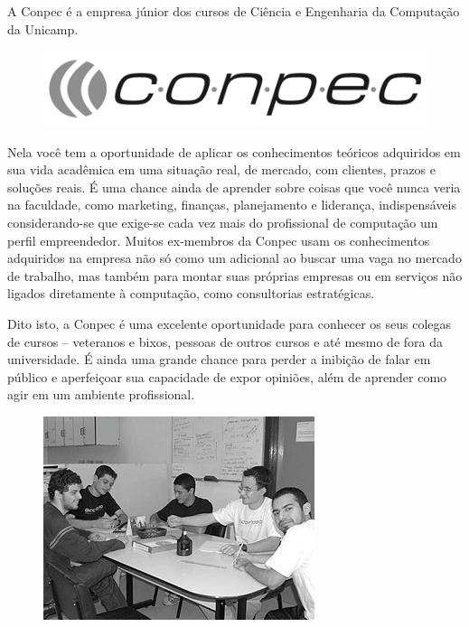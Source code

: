 A Conpec é a empresa júnior dos cursos de Ciência e Engenharia da Computação da
Unicamp.
\begin{figure}[h!]
    \vspace{-10pt}
    \centering
    \includegraphics[scale=0.30, keepaspectratio=true]{img/imgs/19-conpec/logo_bw.png}
    \vspace{-10pt}
\end{figure}
Nela você tem a oportunidade de aplicar os conhecimentos teóricos
adquiridos em sua vida acadêmica em uma situação real, de mercado, com clientes,
prazos e soluções reais. É uma chance ainda de aprender sobre coisas que você
nunca veria na faculdade, como marketing, finanças, planejamento e liderança,
indispensáveis considerando-se que exige-se cada vez mais do profissional de
computação um perfil empreendedor. Muitos ex-membros da Conpec usam os
conhecimentos adquiridos na empresa não só como um adicional ao buscar uma vaga
no mercado de trabalho, mas também para montar suas próprias empresas ou em
serviços não ligados diretamente à computação, como consultorias estratégicas.

Dito isto, a Conpec é uma excelente oportunidade para conhecer os seus colegas
de cursos -- veteranos e bixos, pessoas de outros cursos e até mesmo de fora da
universidade. É ainda uma grande chance para perder a inibição de falar em
público e aperfeiçoar sua capacidade de expor opiniões, além de aprender como
agir em um ambiente profissional.
\begin{figure}[h!]
    \vspace{-10pt}
    \centering
    \includegraphics[scale=0.75, keepaspectratio=true]{img/imgs/19-conpec/-101.jpg}
    \vspace{-10pt}
\end{figure}

